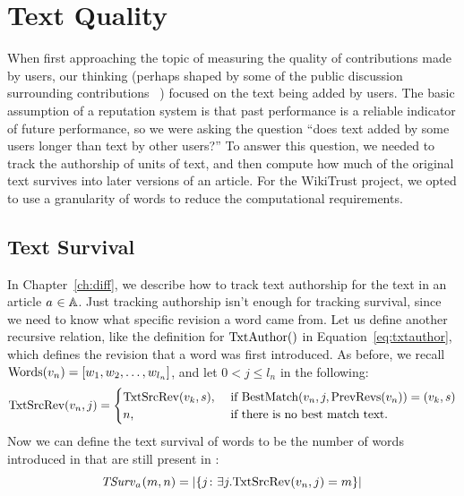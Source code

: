 \section{Text Quality}
\label{sec:textquality}

When first approaching the topic of measuring the quality
of contributions made by users, our thinking (perhaps shaped
by some of the public discussion surrounding
contributions~\cite{Swartz2006} )
focused on the text being added by users.
The basic assumption of a reputation system is that past performance
is a reliable indicator of future performance, so we were
asking the question ``does text added by some users 
longer than text by other users?''
To answer this question, we needed to track the authorship of
units of text, and then compute how much of the original text
survives into later versions of an article.
For the WikiTrust project, we opted to use a granularity of words
to reduce the computational requirements.

\subsection{Text Survival}

In Chapter~\ref{ch:diff}, we describe how to track text authorship
for the text in an article $a_{} \in \mathbb{A}$.
Just tracking authorship isn't enough for tracking survival, since
we need to know what specific revision a word came from.
Let us define another recursive relation, like the definition
for $\mathrm{TxtAuthor}()$ in Equation~\ref{eq:txtauthor},
which defines the revision that a word was first introduced.
As before, we recall
$\mathrm{Words}(v_{n}) = \left[ w_1, w_2, \ldots, w_{l_n} \right]$, and let $0 < j \le l_n$ in the following:
\begin{equation*}
\mathrm{TxtSrcRev}(v_{n}, j) =
    \begin{cases}
        \mathrm{TxtSrcRev}(v_{k}, s), & \text{ if }
        \mathrm{BestMatch}(v_{n}, j, \mathrm{PrevRevs}(v_{n})) = (v_{k}, s) \\
        n, & \text{ if there is no best match text. } \\
    \end{cases}
\end{equation*}
Now we can define the text survival of words to be the number of
words introduced in  that are still present in :
\begin{equation}
\mathit{TSurv}_{a_{}}(m,n) = \left| \left\{ j \colon
    \exists j . \mathrm{TxtSrcRev}(v_{n},j) = m \right\} \right| \\
\end{equation}

